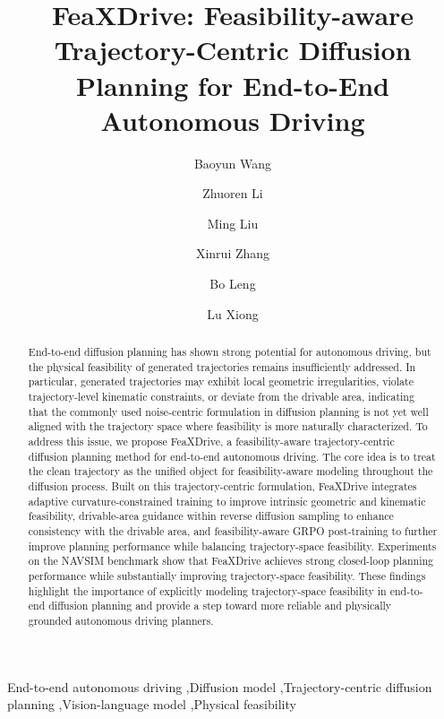 \documentclass[3p,times,authoryear]{elsarticle}
\begin{document}
\begin{frontmatter}

\title{FeaXDrive: Feasibility-aware Trajectory-Centric Diffusion Planning for End-to-End Autonomous Driving}

\author[inst1]{Baoyun Wang}

\author[inst1]{Zhuoren Li}

\author[inst1]{Ming Liu}

\author[inst1]{Xinrui Zhang}

\author[inst1]{Bo Leng}

\author[inst1]{Lu Xiong}



\begin{abstract}
End-to-end diffusion planning has shown strong potential for autonomous driving, but the physical feasibility of generated trajectories remains insufficiently addressed. In particular, generated trajectories may exhibit local geometric irregularities, violate trajectory-level kinematic constraints, or deviate from the drivable area, indicating that the commonly used noise-centric formulation in diffusion planning is not yet well aligned with the trajectory space where feasibility is more naturally characterized. To address this issue, we propose FeaXDrive, a feasibility-aware trajectory-centric diffusion planning method for end-to-end autonomous driving. The core idea is to treat the clean trajectory as the unified object for feasibility-aware modeling throughout the diffusion process. Built on this trajectory-centric formulation, FeaXDrive integrates adaptive curvature-constrained training to improve intrinsic geometric and kinematic feasibility, drivable-area guidance within reverse diffusion sampling to enhance consistency with the drivable area, and feasibility-aware GRPO post-training to further improve planning performance while balancing trajectory-space feasibility. Experiments on the NAVSIM benchmark show that FeaXDrive achieves strong closed-loop planning performance while substantially improving trajectory-space feasibility. These findings highlight the importance of explicitly modeling trajectory-space feasibility in end-to-end diffusion planning and provide a step toward more reliable and physically grounded autonomous driving planners. 
\end{abstract}

\begin{keyword}
End-to-end autonomous driving \sep Diffusion model \sep Trajectory-centric diffusion planning \sep Vision-language model \sep Physical feasibility
\end{keyword}

\end{frontmatter}
\end{document}
